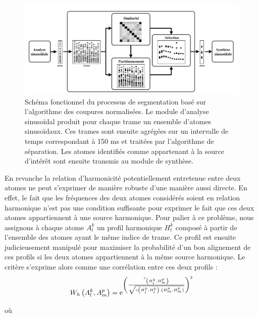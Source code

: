 \begin{figure}[t]
  \includegraphics[width=1\textwidth]{figures/nCutDiagramFr.png}
  \caption{Schéma fonctionnel du processus de segmentation basé sur l'algorithme des coupures normalisées. Le module d'analyse sinusoïdal produit pour chaque trame un ensemble d'atomes sinusoïdaux. Ces trames sont ensuite agrégées sur un intervalle de temps correspondant à 150 ms et traitées par l'algorithme de séparation. Les atomes identifiés comme appartenant à la source d'intérêt sont ensuite transmis au module de synthèse.}  \label{fig:ncut}
\end{figure}

En revanche la relation d'harmonicité potentiellement entretenue entre deux atomes ne peut s'exprimer de manière robuste d'une manière aussi directe. En effet, le fait que les fréquences des deux atomes considérés soient en relation harmonique n'est pas une condition suffisante pour exprimer le fait que ces deux atomes appartiennent à une source harmonique. Pour palier à ce problème, nous assignons à chaque atome $A _ { l } ^ { k }$ un profil harmonique $H _ { l } ^ { k }$ composé à partir de l'ensemble des atomes ayant le même indice de trame. Ce profil est ensuite judicieusement manipulé pour maximiser la probabilité d'un bon alignement de ces profils si les deux atomes appartiennent à la même source harmonique\cite{lagrangeTaslp08}. Le critère s'exprime alors comme une corrélation entre ces deux profils :
\begin{equation}
  W _ { h } \left( A _ { l } ^ { k } , A _ { m } ^ { p } \right) = \operatorname{e}^{\left( \frac { c _ { \left( H _ { l } ^ { k } , H _ { m } ^ { p } \right) } } { \sqrt { c \left( H _ { l } ^ { k } , H _ { l } ^ { k } \right) \cdot \left( H _ { m } ^ { p } , H _ { m } ^ { p } \right) } } \right) ^ { 2 } }
\end{equation}

où

